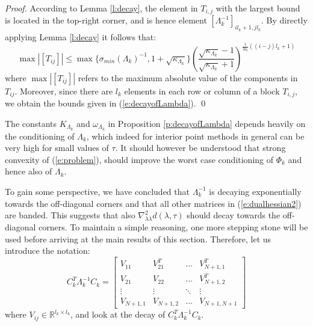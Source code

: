 \begin{proof}
According to Lemma \ref{l:decay}, the element in $T_{i,j}$ with the largest bound is located in the top-right corner, and is hence element $[\Lambda_k^{-1}]_{i l_k + 1, j l_k}$. By directly applying Lemma \ref{l:decay} it follows that:
\begin{equation}
\max \left| [ T_{ij} ] \right| \leq \max \{ \sigma_{min}(\Lambda_k)^{-1}, 1 +  \sqrt{\kappa_{\Lambda_k}} \} \left( \frac{ \sqrt{\kappa_{\Lambda_k}} - 1}{ \sqrt{\kappa_{\Lambda_k}} + 1} \right)^{\frac{1}{3l_k}((i - j)l_k + 1)}
\end{equation}
where $\max \left| [ T_{ij} ] \right| $ refers to the maximum absolute value of the components in $T_{ij}$. Moreover, since there are $l_k$ elements in each row or column of a block $T_{i,j}$, we obtain the bounds given in (\ref{e:decayofLambda}).
\qed
\end{proof}

The constants $K_{\Lambda_k}$ and $\omega_{\Lambda_k}$ in Proposition \ref{p:decayofLambda} depends heavily on the conditioning of $\Lambda_k$, which indeed for interior point methods in general can be very high for small values of $\tau$. It should however be understood that strong convexity of (\ref{e:problem}), should improve the worst case conditioning of $\Phi_k$ and hence also of $\Lambda_k$.

To gain some perspective, we have concluded that $\Lambda_k^{-1}$ is decaying exponentially towards the off-diagonal corners and that all other matrices in (\ref{e:dualhessian2}) are banded. This suggests that also $\nabla_{\lambda \lambda}^2 d(\lambda, \tau)$ should decay towards the off-diagonal corners. To maintain a simple reasoning, one more stepping stone will be used before arriving at the main results of this section. Therefore, let us introduce the notation:
\begin{equation}
C_k^T \Lambda_k^{-1} C_k = \left[ \begin{array}{cccc}
V_{11} & V_{21}^T & \hdots & V_{N+1,1}^T \\
V_{21} & V_{22} & \hdots & V_{N+1,2}^T \\
\vdots & \vdots  & \ddots & \vdots \\
V_{N+1,1} & V_{N+1,2} & \hdots & V_{N+1,N+1}
\end{array} \right]
\end{equation}
where $V_{ij} \in \mathbb{R}^{l_{k} \times l_{k}}$, and look at the decay of $C_k^T \Lambda_k^{-1} C_k$.

